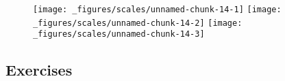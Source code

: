 \begin{Shaded}
\begin{Highlighting}[]
\StringTok{ }\NormalTok{(} \NormalTok{, } \OperatorTok{:}\NormalTok{, } \OperatorTok{:}\NormalTok{)}
\StringTok{ }\OperatorTok{+}\StringTok{ }\NormalTok{(}\NormalTok{(}

\OperatorTok{+}\StringTok{ }\NormalTok{(} \NormalTok{(} \NormalTok{))}
\OperatorTok{+}\StringTok{ }\NormalTok{(} \NormalTok{(} \NormalTok{(}\NormalTok{, }\NormalTok{)))}
\end{Highlighting}
\end{Shaded}

\begin{figure}[H]
  \texttt{[image: \_figures/scales/unnamed-chunk-14-1]}%
  \texttt{[image: \_figures/scales/unnamed-chunk-14-2]}%
  \texttt{[image: \_figures/scales/unnamed-chunk-14-3]}
\end{figure}

\hypertarget{exercises-2}{%
\subsection{Exercises}\label{exercises-2}}


